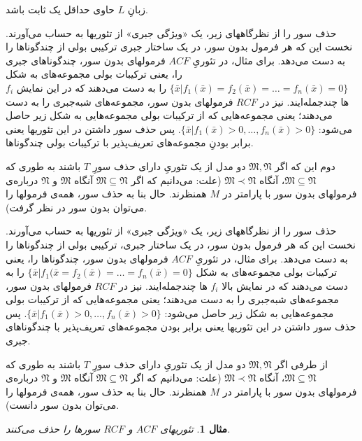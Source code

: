 \documentclass[12pt,a4paper]{article}
\theoremstyle{colorhead}
\newtheorem{mesal}[thm]{مثال}
\begin{document}
زبانِ
$L$
حاوی 
حداقل یک ثابت باشد.
\par 
حذف سور را از نظرگاههای زیر،
 یک «ویژگی جبری» از تئوریها به حساب می‌آورند.  نخست این که هر فرمول بدون سور، در یک ساختار جبری ترکیبی بولی 
 از چندگوناها 
 را به دست می‌دهد. برای مثال، در تئوریِ
  $ACF$
  فرمولهای 
  بدون سور، چندگوناهای جبری را، یعنی ترکیبات بولی مجموعه‌های به شکل
  $\{\bar{x}|f_1(\bar{x})=f_2(\bar{x})=\ldots=f_n(\bar{x})=0\}$
   را به دست می‌دهند که در این نمایش
  $f_i$
  ها چندجمله‌ایند. 
  نیز در
  $RCF$
  فرمولهای بدون سور، 
  مجموعه‌های شبه‌جبری 
  را به دست می‌دهند؛ یعنی مجموعه‌هایی که از ترکیبات بولی مجموعه‌هایی به شکل زیر حاصل می‌شود:
  $\{\bar{x}|f_1(\bar{x})>0, \ldots, f_n(\bar{x})>0\}$.
  پس 
  حذف سور داشتن در این تئوریها یعنی برابر بودنِ مجموعه‌های تعریف‌پذیر با 
  ترکیبات بولی چندگوناها. 
  \par 
 دوم این که اگر
  $\mathfrak{M},\mathfrak{N}$
  دو
  مدل از یک تئوریِ دارای حذف سورِ
  $T$
  باشند به طوری که
  $\mathfrak{M}\subseteq \mathfrak{N}$،
  آنگاه
  $\mathfrak{M}\prec \mathfrak{N}$
  (علت: می‌دانیم که اگر
  $\mathfrak{M}\subseteq \mathfrak{N}$
  آنگاه 
  $\mathfrak{M}$
  و
  $\mathfrak{N}$
  درباره‌ی 
  فرمولهای بدون سور با پارامتر در
  $M$
  همنظرند. حال
  بنا به حذف سور، همه‌ی فرمولها را می‌توان بدون سور در نظر گرفت).
\par 
حذف سور را از نظرگاههای زیر،
 یک «ویژگی جبری» از تئوریها به حساب می‌آورند.  نخست این که هر فرمول بدون سور، در یک ساختار جبری، ترکیبی بولی 
 از چندگوناها را به دست می‌دهد. برای مثال، در تئوریِ
  $ACF$
  فرمولهای 
  بدون سور، چندگوناها را، یعنی ترکیبات بولی مجموعه‌های به شکل
  $\{\bar{x}|f_1(\bar{x}=f_2(\bar{x})=\ldots=f_n(\bar{x})=0\}$
   را به دست می‌دهند که در نمایش بالا
  $f_i$
  ها چندجمله‌ایند. 
  نیز در
  $RCF$
  فرمولهای بدون سور، 
  مجموعه‌های شبه‌جبری را به دست می‌دهند؛ یعنی مجموعه‌هایی که از ترکیبات بولی مجموعه‌هایی به شکل زیر حاصل می‌شود:
  $\{\bar{x}|f_1(\bar{x})>0, \ldots, f_n(\bar{x})>0\}$.
  پس 
  حذف سور داشتن در این تئوریها یعنی برابر بودن مجموعه‌های تعریف‌پذیر با چندگوناهای جبری.
  \par 
  از طرفی اگر
  $\mathfrak{M},\mathfrak{N}$
  دو
  مدل از یک تئوریِ دارای حذف سورِ
  $T$
  باشند به طوری که
  $\mathfrak{M}\subseteq \mathfrak{N}$،
  آنگاه
  $\mathfrak{M}\prec \mathfrak{N}$
  (علت: می‌دانیم که اگر
  $\mathfrak{M}\subseteq \mathfrak{N}$
  آنگاه 
  $\mathfrak{M}$
  و
  $\mathfrak{N}$
  درباره‌ی 
  فرمولهای بدون سور با پارامتر در
  $M$
  همنظرند. حال
  بنا به حذف سور، همه‌ی فرمولها را می‌توان بدون سور دانست).
  \begin{mesal}
  تئوریهای
  $ACF$
  و
  $RCF$
  سورها را حذف می‌کنند.
  \end{mesal}
\end{document}
